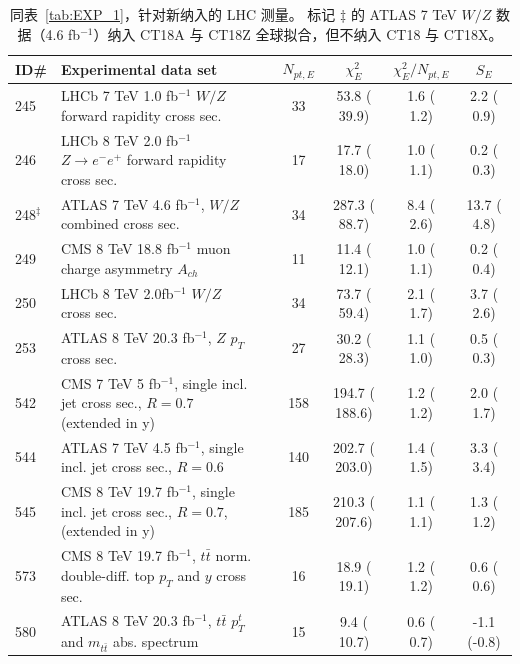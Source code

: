 \begin{table}[tb]
\begin{tabular}{|l|lr|c|c|c|c|}
\hline
\textbf{ID\# }  & \textbf{Experimental data set} &  & $N_{pt, E}$  & $\chi^2_E$ & $\chi^{2}_E/N_{pt, E}$  & $S_E$ \tabularnewline
\hline
\hline
 245 & LHCb 7 TeV 1.0 fb$^{-1}$ $W/Z$ forward rapidity cross sec.                          & \cite{Aaij:2015gna}        &  33  &   53.8 (  39.9) &  1.6 (  1.2) &  2.2 ( 0.9) \tabularnewline\hline
 246 & LHCb 8 TeV  2.0 fb$^{-1}$ $Z\rightarrow e^{-} e^{+}$ forward rapidity cross sec.    & \cite{Aaij:2015vua}        &  17  &   17.7 (  18.0) &  1.0 (  1.1) &  0.2 ( 0.3) \tabularnewline\hline
 248$^{\ddagger}$ & ATLAS 7 TeV 4.6 fb$^{-1}$, $W/Z$ combined cross sec.                   & \cite{Aaboud:2016btc}      &  34  &  287.3 (  88.7) &  8.4 (  2.6) & 13.7 ( 4.8) \tabularnewline\hline
 249 & CMS 8 TeV 18.8 fb$^{-1}$ muon charge asymmetry $A_{ch}$                                & \cite{Khachatryan:2016pev} &  11  &   11.4 (  12.1) &  1.0 (  1.1) &  0.2 ( 0.4) \tabularnewline\hline
 250 & LHCb 8 TeV 2.0fb$^{-1}$ $W/Z$ cross sec.                                            & \cite{Aaij:2015zlq}        &  34  &   73.7 (  59.4) &  2.1 (  1.7) &  3.7 ( 2.6) \tabularnewline\hline
 253 & ATLAS 8 TeV 20.3 fb$^{-1}$, $Z$ $p_T$ cross sec.                                    & \cite{Aad:2015auj}         &  27  &   30.2 (  28.3) &  1.1 (  1.0) &  0.5 ( 0.3) \tabularnewline\hline
 542 & CMS 7 TeV 5 fb$^{-1}$, single incl. jet cross sec., $R=0.7$ (extended in y)         & \cite{Chatrchyan:2014gia}  & 158  &  194.7 ( 188.6) &  1.2 (  1.2) &  2.0 ( 1.7) \tabularnewline\hline
 544 & ATLAS 7 TeV  4.5 fb$^{-1}$, single incl. jet cross sec., $R=0.6$                    & \cite{Aad:2014vwa}         & 140  &  202.7 ( 203.0) &  1.4 (  1.5) &  3.3 ( 3.4) \tabularnewline\hline
 545 & CMS 8 TeV 19.7 fb$^{-1}$, single incl. jet cross sec., $R=0.7$, (extended in y)     & \cite{Khachatryan:2016mlc} & 185  &  210.3 ( 207.6) &  1.1 (  1.1) &  1.3 ( 1.2) \tabularnewline\hline
 573 & CMS 8 TeV 19.7 fb$^{-1}$, $t\bar{t}$ norm. double-diff. top $p_T$ and $y$ cross sec. & \cite{Sirunyan:2017azo}    &  16  &   18.9 (  19.1) &  1.2 (  1.2) &  0.6 ( 0.6) \tabularnewline\hline
 580 & ATLAS 8 TeV 20.3 fb$^{-1}$, $t\bar{t}$ $p_{T}^{t}$ and $m_{t\bar{t}}$ abs. spectrum    & \cite{Aad:2015mbv}         &  15  &    9.4 (  10.7) &  0.6 (  0.7) & -1.1 (-0.8) \tabularnewline
 \hline
\end{tabular}
\caption{同表~\ref{tab:EXP_1}，针对新纳入的 LHC 测量。
	标记 $\ddagger$ 的 ATLAS 7 TeV $W/Z$ 数据（4.6 fb$^{-1}$）纳入 CT18A 与 CT18Z 全球拟合，但不纳入 CT18 与 CT18X。
\label{tab:EXP_2} }
\end{table}
\endgroup






